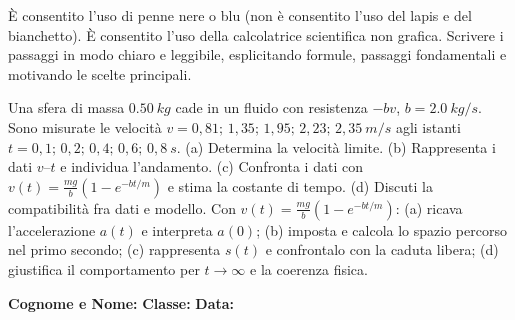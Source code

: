 \documentclass[a4paper,10pt]{exam}
\begin{document}
\begin{tcolorbox}[istruzionibox]
È consentito l'uso di penne nere o blu (non è consentito l'uso del lapis e del bianchetto).
È consentito l'uso della calcolatrice scientifica non grafica.
Scrivere i passaggi in modo chiaro e leggibile, esplicitando formule, passaggi fondamentali e motivando le scelte principali.
\end{tcolorbox}

\vspace{1.5mm}


\begin{questions}
\question Una sfera di massa $\SI{0.50}{kg}$ cade in un fluido con resistenza $-bv$, $b=\SI{2.0}{kg/s}$. Sono misurate le velocità $v=0{,}81;\,1{,}35;\,1{,}95;\,2{,}23;\,2{,}35\ \si{m/s}$ agli istanti $t=0{,}1;\,0{,}2;\,0{,}4;\,0{,}6;\,0{,}8\ \si{s}$. (a) Determina la velocità limite. (b) Rappresenta i dati $v$--$t$ e individua l'andamento. (c) Confronta i dati con $v(t)=\frac{mg}{b}\left(1-e^{-bt/m}\right)$ e stima la costante di tempo. (d) Discuti la compatibilità fra dati e modello.
\question Con $v(t)=\frac{mg}{b}\left(1-e^{-bt/m}\right)$: (a) ricava l'accelerazione $a(t)$ e interpreta $a(0)$; (b) imposta e calcola lo spazio percorso nel primo secondo; (c) rappresenta $s(t)$ e confrontalo con la caduta libera; (d) giustifica il comportamento per $t\to\infty$ e la coerenza fisica.
\end{questions}
\null
\vfill

\noindent
\textbf{Cognome e Nome:}\enspace\hrulefill\hspace{1cm}%
\textbf{Classe:}\enspace\makebox[2.5cm]{\hrulefill}\hspace{1cm}%
\textbf{Data:}\enspace\makebox[2.5cm]{\hrulefill}

\vspace{3mm}
\end{document}
